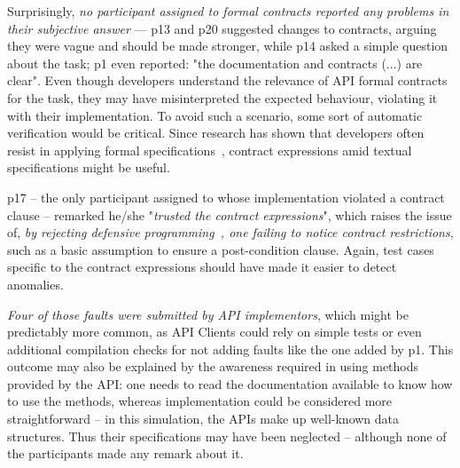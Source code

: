 Surprisingly, \emph{no participant assigned to formal contracts reported any problems in their subjective answer} –– p13 and p20 suggested changes to contracts, arguing they were vague and should be made stronger, while p14 asked a simple question about the task; p1 even reported: "the documentation and contracts (...) are clear".
Even though developers understand the relevance of API formal contracts for the task, they may have misinterpreted the expected behaviour, violating it with their implementation.
To avoid such a scenario, some sort of automatic verification would be critical.
Since research has shown that developers often resist in applying formal specifications~\cite{Polikarpova-etal09,Estler-etal14}, contract expressions amid textual specifications might be useful.

p17 -- the only participant assigned to \contractjdoc{} whose implementation violated a contract clause -- remarked he/she "\emph{trusted the contract expressions}", 
which raises the issue of, \emph{by rejecting defensive programming~\cite{dbc}, one failing to notice contract restrictions}, such as a basic assumption to ensure a post-condition clause.
Again, test cases specific to the contract expressions should have made it easier to detect anomalies.

\emph{Four of those faults were submitted by API implementors}, which might be predictably more common, as API Clients could rely on simple tests or even additional compilation checks for not adding faults like the one added by p1.
This outcome may also be explained by the awareness required in using methods provided by the API: one needs to read the documentation available to know how to use the methods, whereas implementation could be considered more straightforward -- in this simulation, 
the APIs make up well-known data structures. Thus their specifications may have been neglected -- although none of the participants made any remark about it.

